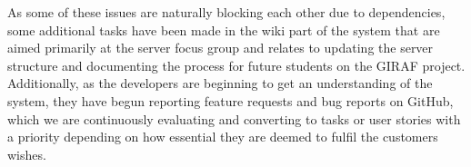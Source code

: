 As some of these issues are naturally blocking each other due to dependencies, some additional tasks have been made in the wiki part of the system that are aimed primarily at the server focus group and relates to updating the server structure and documenting the process for future students on the GIRAF project.
Additionally, as the developers are beginning to get an understanding of the system, they have begun reporting feature requests and bug reports on GitHub, which we are continuously evaluating and converting to tasks or user stories with a priority depending on how essential they are deemed to fulfil the customers wishes.
